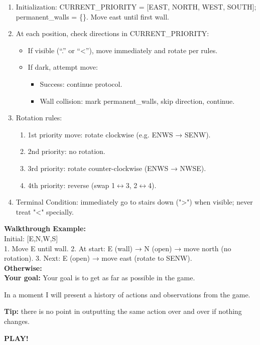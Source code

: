 \begin{MyGreenBox}[frametitle={\textbf{Iteration 2 MiniHack Prompt}}]
{\begin{enumerate}
  \item Initialization: CURRENT\_PRIORITY = [EAST, NORTH, WEST, SOUTH]; permanent\_walls = \{\}. Move east until first wall.
  \item At each position, check directions in CURRENT\_PRIORITY:
    \begin{itemize}
      \item If visible (“.” or “<”), move immediately and rotate per rules.
      \item If dark, attempt move:
        \begin{itemize}
          \item Success: continue protocol.
          \item Wall collision: mark permanent\_walls, skip direction, continue.
        \end{itemize}
    \end{itemize}
  \item Rotation rules:
    \begin{enumerate}
      \item 1st priority move: rotate clockwise (e.g. ENWS → SENW).
      \item 2nd priority: no rotation.
      \item 3rd priority: rotate counter-clockwise (ENWS → NWSE).
      \item 4th priority: reverse (swap 1$\leftrightarrow$3, 2$\leftrightarrow$4).
    \end{enumerate}
  \item Terminal Condition: immediately go to stairs down (">") when visible; never treat "<" specially.
\end{enumerate}

\textbf{Walkthrough Example:}\\
Initial: [E,N,W,S]\\
1. Move E until wall.  
2. At start: E (wall) → N (open) → move north (no rotation).  
3. Next: E (open) → move east (rotate to SENW).\\

\textbf{Otherwise:}\\
\textbf{Your goal:} Your goal is to get as far as possible in the game.

In a moment I will present a history of actions and observations from the game.

\textbf{Tip:} there is no point in outputting the same action over and over if nothing changes.

\textbf{PLAY!}
}
\end{MyGreenBox}


